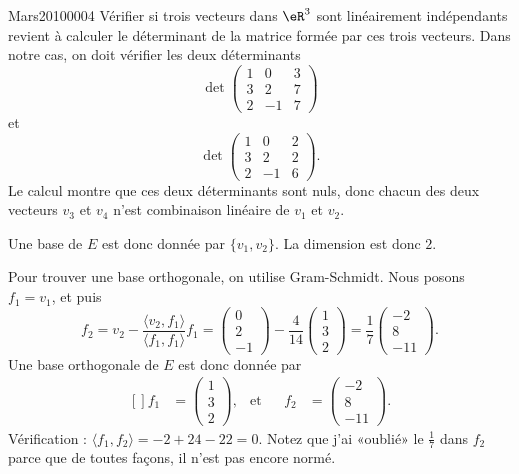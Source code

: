 \begin{corrige}{Mars20100004}
	Vérifier si trois vecteurs dans $\eR^3$ sont linéairement indépendants revient à calculer le déterminant de la matrice formée par ces trois vecteurs. Dans notre cas, on doit vérifier les deux déterminants
	\begin{equation}
		\det\begin{pmatrix}
			1	&	0	&	3	\\
			3	&	2	&	7	\\
			2	&	-1	&	7
		\end{pmatrix}
	\end{equation}
	et
	\begin{equation}
		\det\begin{pmatrix}
			1	&	0	&	2	\\
			3	&	2	&	2	\\
			2	&	-1	&	6
		\end{pmatrix}.
	\end{equation}
	Le calcul montre que ces deux déterminants sont nuls, donc chacun des deux vecteurs $v_3$ et $v_4$ n'est combinaison linéaire de $v_1$ et $v_2$. 

	Une base de $E$ est donc donnée par $\{ v_1,v_2 \}$. La dimension est donc $2$.
	
	Pour trouver une base orthogonale, on utilise Gram-Schmidt. Nous posons $f_1=v_1$, et puis
	\begin{equation}
		f_2=v_2-\frac{ \langle v_2, f_1\rangle  }{ \langle f_1, f_1\rangle  }f_1=\begin{pmatrix}
			0	\\ 
			2	\\ 
			-1	
		\end{pmatrix}-\frac{ 4 }{ 14 }\begin{pmatrix}
			1	\\ 
			3	\\ 
			2	
		\end{pmatrix}=\frac{1}{ 7 }\begin{pmatrix}
			-2	\\ 
			8	\\ 
			-11	
		\end{pmatrix}.
	\end{equation}
	Une base orthogonale de $E$ est donc donnée par
	\begin{equation}
		\begin{aligned}[]
			f_1&=\begin{pmatrix}
				1	\\ 
				3	\\ 
				2	
			\end{pmatrix},&\text{et}&
			&f_2&=\begin{pmatrix}
				-2	\\ 
				8	\\ 
				-11	
			\end{pmatrix}.
		\end{aligned}
	\end{equation}
	Vérification : $\langle f_1, f_2\rangle =-2+24-22=0$. Notez que j'ai «oublié» le $\frac{1}{ 7 }$ dans $f_2$ parce que de toutes façons, il n'est pas encore normé.


\end{corrige}
